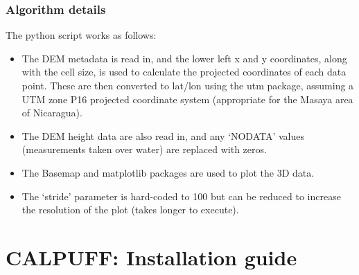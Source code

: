 \documentclass[10pt,a4paper]{article}
\begin{document}
\subsubsection{Algorithm details}
The python script works as follows:
\begin{itemize}
\item The DEM metadata is read in, and the lower left x and y coordinates, along with the cell size, is used to calculate the projected coordinates of each data point. These are then converted to lat/lon using the utm package, assuming a UTM zone P16 projected coordinate system (appropriate for the Masaya area of Nicaragua).
\item The DEM height data are also read in, and any `NODATA' values (measurements taken over water) are replaced with zeros.
\item The Basemap and matplotlib packages are used to plot the 3D data.
\item The `stride' parameter is hard-coded to 100 but can be reduced to increase the resolution of the plot (takes longer to execute).
\end{itemize}

\section{CALPUFF: Installation guide} \label{Installation}
\end{document}
